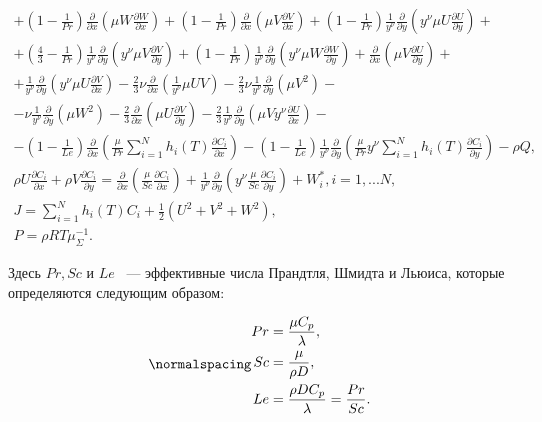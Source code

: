 \begin{equation}
\begin{gathered}
+ (1 - \frac{1}{Pr})\frac{\partial}{\partial x}(\mu W\frac{\partial W}{\partial x}) + (1 - \frac{1}{Pr})\frac{\partial}{\partial x}(\mu V\frac{\partial V}{\partial x}) + (1 - \frac{1}{Pr})\frac{1}{y^\nu}\frac{\partial}{\partial y}(y^\nu\mu U\frac{\partial U}{\partial y})+\\
+ (\frac{4}{3} - \frac{1}{Pr})\frac{1}{y^\nu}\frac{\partial}{\partial y}(y^\nu\mu V\frac{\partial V}{\partial y}) + (1 - \frac{1}{Pr})\frac{1}{y^\nu}\frac{\partial}{\partial y}(y^\nu\mu W\frac{\partial W}{\partial y}) + \frac{\partial}{\partial x}(\mu V\frac{\partial U}{\partial y})+\\
+ \frac{1}{y^\nu}\frac{\partial}{\partial y}(y^\nu\mu U\frac{\partial V}{\partial x}) - \frac{2}{3}\nu\frac{\partial}{\partial x}(\frac{1}{y^\nu}\mu UV) - \frac{2}{3}\nu\frac{1}{y^\nu}\frac{\partial}{\partial y}(\mu V^2)-\\
- \nu\frac{1}{y^\nu}\frac{\partial}{\partial y}(\mu W^2) - \frac{2}{3}\frac{\partial}{\partial x}(\mu U \frac{\partial V}{\partial y}) - \frac{2}{3}\frac{1}{y^\nu}\frac{\partial}{\partial y}(\mu Vy^\nu \frac{\partial U}{\partial x})-\\
- (1 - \frac{1}{Le})\frac{\partial}{\partial x}(\frac{\mu}{Pr}\sum_{i = 1}^{N} h_i(T)\frac{\partial C_i}{\partial x}) - (1 - \frac{1}{Le})\frac{1}{y^\nu}\frac{\partial}{\partial y}(\frac{\mu}{Pr}y^\nu\sum_{i = 1}^{N} h_i(T)\frac{\partial C_i}{\partial y}) - \rho Q, \\
%
\rho U \frac{\partial C_i}{\partial x} + \rho V \frac{\partial C_i}{\partial y} = \frac{\partial}{\partial x}(\frac{\mu}{Sc}\frac{\partial C_i}{\partial x}) + \frac{1}{y^\nu}\frac{\partial}{\partial y}(y^\nu\frac{\mu}{Sc}\frac{\partial C_i}{\partial y}) + W_i^*, i = 1,...N, \\
%
J = \sum_{i = 1}^{N} h_i(T)C_i + \frac{1}{2}(U^2 + V^2 + W^2), \\
%
P = \rho RT\mu_\Sigma^{-1}.
\end{gathered}
\end{equation}

Здесь $Pr, Sc$ и $Le$ ~---  эффективные числа Прандтля, Шмидта и Льюиса, которые определяются следующим образом:

\begin{equation}
\normalspacing
\begin{split}
    Pr &= \frac{\mu C_p}{\lambda}, \\
    Sc &= \frac{\mu}{\rho D}, \\
    Le &= \frac{\rho D C_p}{\lambda} = \frac{Pr}{Sc}.
\end{split}
\end{equation}

